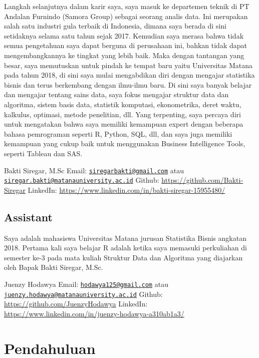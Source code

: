 \documentclass[
]{book}
\begin{document}
Langkah selanjutnya dalam karir saya, saya masuk ke departemen teknik di PT Andalan Furnindo (Samora Group) sebagai seorang analis data. Ini merupakan salah satu industri gula terbaik di Indonesia, dimana saya berada di sini setidaknya selama satu tahun sejak 2017. Kemudian saya merasa bahwa tidak semua pengetahuan saya dapat berguna di perusahaan ini, bahkan tidak dapat mengembangkannya ke tingkat yang lebih baik. Maka dengan tantangan yang besar, saya memutuskan untuk pindah ke tempat baru yaitu Universitas Matana pada tahun 2018, di sini saya mulai mengabdikan diri dengan mengajar statistika bisnis dan terus berkembang dengan ilmu-ilmu baru. Di sini saya banyak belajar dan mengajar tentang sains data, saya fokus mengajar struktur data dan algoritma, sistem basis data, statistik komputasi, ekonometrika, deret waktu, kalkulus, optimasi, metode penelitian, dll. Yang terpenting, saya percaya diri untuk mengatakan bahwa saya memiliki kemampuan expert dengan beberapa bahasa pemrograman seperti R, Python, SQL, dll, dan saya juga memiliki kemampuan yang cukup baik untuk menggunakan Business Intelligence Tools, seperti Tableau dan SAS.

Bakti Siregar, M.Sc
Email: \href{mailto:siregarbakti@gmail.com}{\nolinkurl{siregarbakti@gmail.com}} atau \href{mailto:siregar.bakti@matanauniversity.ac.id}{\nolinkurl{siregar.bakti@matanauniversity.ac.id}}
Github: \url{https://github.com/Bakti-Siregar}
LinkedIn: \url{https://www.linkedin.com/in/bakti-siregar-15955480/}

\hypertarget{assistant}{%
\section*{Assistant}\label{assistant}}

Saya adalah mahasiswa Universitas Matana jurusan Statistika Bisnis angkatan 2018. Pertama kali saya belajar R adalah ketika saya memasuki perkuliahan di semester ke-3 pada mata kuliah Struktur Data dan Algoritma yang diajarkan oleh Bapak Bakti Siregar, M.Sc.

Juenzy Hodawya
Email: \href{mailto:hodawya125@gmail.com}{\nolinkurl{hodawya125@gmail.com}} atau \href{mailto:juenzy.hodawya@matanauniversity.ac.id}{\nolinkurl{juenzy.hodawya@matanauniversity.ac.id}}
Github: \url{https://github.com/JuenzyHodawya}
LinkedIn: \url{https://www.linkedin.com/in/juenzy-hodawya-a310ab1a3/}

\hypertarget{Pendahuluan}{%
\chapter{Pendahuluan}\label{Pendahuluan}}
\end{document}
